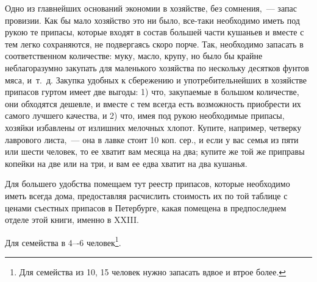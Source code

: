 Одно из главнейших оснований экономии в хозяйстве, без сомнения,~--- запас провизии. Как бы мало хозяйство это ни было, все-таки необходимо иметь под рукою те припасы, которые входят в состав большей части кушаньев и вместе с тем легко сохраняются, не подвергаясь скоро порче. Так, необходимо запасать в соответственном количестве: муку, масло, крупу, но было бы крайне неблагоразумно закупать для маленького хозяйства по нескольку десятков фунтов мяса, и~т.~д. Закупка удобных к сбережению и употребительнейших в хозяйстве припасов гуртом имеет две выгоды: 1) что, закупаемые в большом количестве, они обходятся дешевле, и вместе с тем всегда есть возможность приобрести их самого лучшего качества, и 2) что, имея под рукою необходимые припасы, хозяйки избавлены от излишних мелочных хлопот. Купите, например, четверку лаврового листа,~--- она в лавке стоит 10 коп. сер., и если у вас семья из пяти или шести человек, то ее хватит вам месяца на два; купите же той же приправы копейки на две или на три, и вам ее едва хватит на два кушанья.

Для большего удобства помещаем тут реестр припасов, которые необходимо иметь всегда дома, предоставляя расчислить стоимость их по той таблице с ценами съестных припасов в Петербурге, какая помещена в предпоследнем отделе этой книги, именно в XXIII.

Для семейства в 4–-6 человек\footnote{Для семейства из 10, 15 человек нужно запасать вдвое и втрое более.}.

